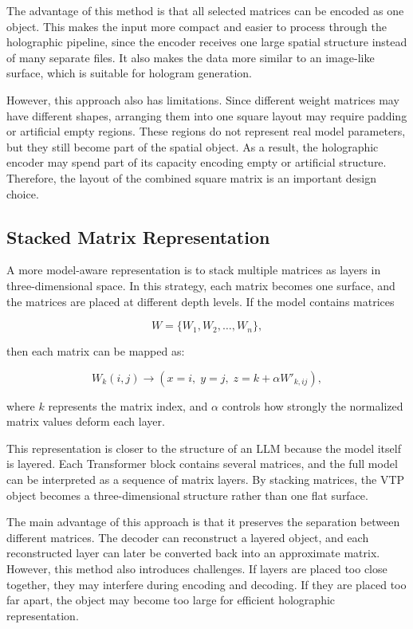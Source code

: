 \documentclass{article}
\begin{document}
\begin{normalsize}
The advantage of this method is that all selected matrices can be encoded as one object. This makes the input more compact and easier to process through the holographic pipeline, since the encoder receives one large spatial structure instead of many separate files. It also makes the data more similar to an image-like surface, which is suitable for hologram generation.

However, this approach also has limitations. Since different weight matrices may have different shapes, arranging them into one square layout may require padding or artificial empty regions. These regions do not represent real model parameters, but they still become part of the spatial object. As a result, the holographic encoder may spend part of its capacity encoding empty or artificial structure. Therefore, the layout of the combined square matrix is an important design choice.

\subsection{Stacked Matrix Representation}

A more model-aware representation is to stack multiple matrices as layers in three-dimensional space. In this strategy, each matrix becomes one surface, and the matrices are placed at different depth levels. If the model contains matrices

\[
W = \{W_1, W_2, \ldots, W_n\},
\]

then each matrix can be mapped as:

\[
W_k(i,j) \rightarrow (x=i,\; y=j,\; z=k + \alpha W'_{k,ij}),
\]

where \(k\) represents the matrix index, and \(\alpha\) controls how strongly the normalized matrix values deform each layer.

This representation is closer to the structure of an LLM because the model itself is layered. Each Transformer block contains several matrices, and the full model can be interpreted as a sequence of matrix layers. By stacking matrices, the VTP object becomes a three-dimensional structure rather than one flat surface.

The main advantage of this approach is that it preserves the separation between different matrices. The decoder can reconstruct a layered object, and each reconstructed layer can later be converted back into an approximate matrix. However, this method also introduces challenges. If layers are placed too close together, they may interfere during encoding and decoding. If they are placed too far apart, the object may become too large for efficient holographic representation.


\end{normalsize}
\end{document}
